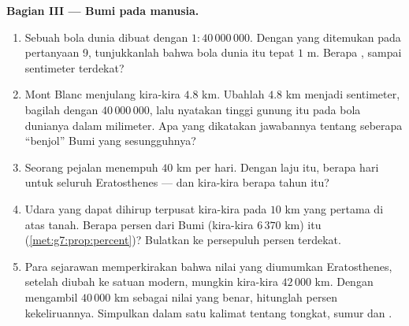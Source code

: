 \begin{problem}
\medskip
\noindent\textbf{Bagian III --- Bumi pada  manusia.}
\begin{enumerate}[resume]
  \item Sebuah bola dunia dibuat dengan  $1 : 40\,000\,000$.
        Dengan  yang ditemukan pada pertanyaan 9,
        tunjukkanlah bahwa  bola dunia itu tepat $1$ m.
        Berapa , sampai sentimeter terdekat?
  \item Mont Blanc menjulang kira-kira $4.8$ km. Ubahlah $4.8$ km
        menjadi sentimeter, bagilah dengan $40\,000\,000$, lalu
        nyatakan tinggi gunung itu pada bola dunianya dalam
        milimeter. Apa yang dikatakan jawabannya tentang seberapa
        ``benjol'' Bumi yang sesungguhnya?
  \item Seorang pejalan menempuh $40$ km per hari. Dengan laju itu,
        berapa hari untuk seluruh  Eratosthenes --- dan
        kira-kira berapa tahun itu?
  \item Udara yang dapat dihirup terpusat kira-kira pada $10$ km yang
        pertama di atas tanah. Berapa persen dari  Bumi
        (kira-kira $6\,370$ km) itu
        (\cref{met:g7:prop:percent})? Bulatkan ke persepuluh persen
        terdekat.
  \item Para sejarawan memperkirakan bahwa nilai yang diumumkan
        Eratosthenes, setelah diubah ke satuan modern, mungkin
        kira-kira $42\,000$ km. Dengan mengambil $40\,000$ km sebagai
        nilai yang benar, hitunglah persen kekeliruannya. Simpulkan
        dalam satu kalimat tentang tongkat, sumur dan .

\end{enumerate}
\end{problem}
